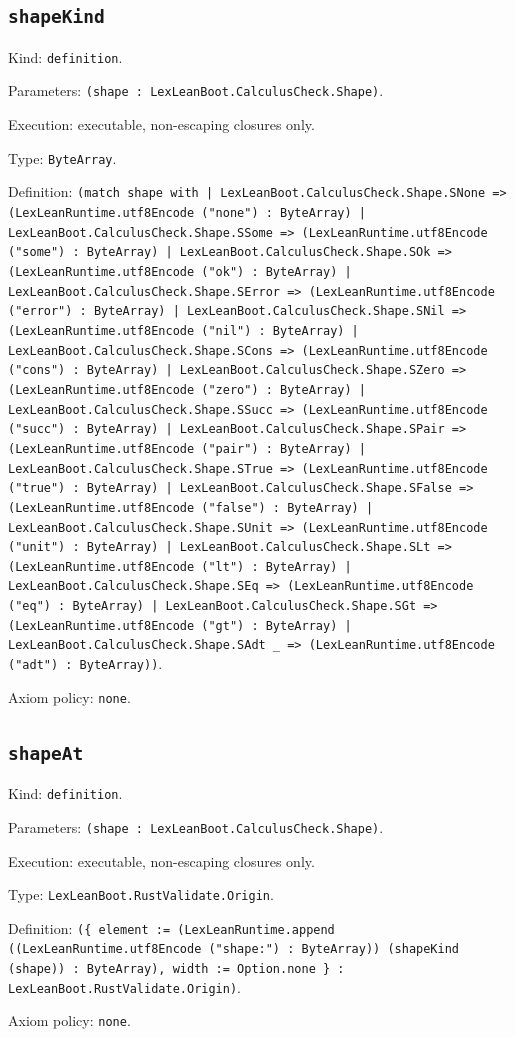 \documentclass[11pt]{article}
\begin{document}
\subsection*{\texttt{shapeKind}}
\noindent Kind: \texttt{definition}.\par
\noindent Parameters: \texttt{(shape : LexLeanBoot.CalculusCheck.Shape)}.\par
\noindent Execution: executable, non-escaping closures only.\par
\noindent Type: \texttt{ByteArray}.\par
\noindent Definition: \texttt{(match shape with | LexLeanBoot.CalculusCheck.Shape.SNone => (LexLeanRuntime.utf8Encode ("none") : ByteArray) | LexLeanBoot.CalculusCheck.Shape.SSome => (LexLeanRuntime.utf8Encode ("some") : ByteArray) | LexLeanBoot.CalculusCheck.Shape.SOk => (LexLeanRuntime.utf8Encode ("ok") : ByteArray) | LexLeanBoot.CalculusCheck.Shape.SError => (LexLeanRuntime.utf8Encode ("error") : ByteArray) | LexLeanBoot.CalculusCheck.Shape.SNil => (LexLeanRuntime.utf8Encode ("nil") : ByteArray) | LexLeanBoot.CalculusCheck.Shape.SCons => (LexLeanRuntime.utf8Encode ("cons") : ByteArray) | LexLeanBoot.CalculusCheck.Shape.SZero => (LexLeanRuntime.utf8Encode ("zero") : ByteArray) | LexLeanBoot.CalculusCheck.Shape.SSucc => (LexLeanRuntime.utf8Encode ("succ") : ByteArray) | LexLeanBoot.CalculusCheck.Shape.SPair => (LexLeanRuntime.utf8Encode ("pair") : ByteArray) | LexLeanBoot.CalculusCheck.Shape.STrue => (LexLeanRuntime.utf8Encode ("true") : ByteArray) | LexLeanBoot.CalculusCheck.Shape.SFalse => (LexLeanRuntime.utf8Encode ("false") : ByteArray) | LexLeanBoot.CalculusCheck.Shape.SUnit => (LexLeanRuntime.utf8Encode ("unit") : ByteArray) | LexLeanBoot.CalculusCheck.Shape.SLt => (LexLeanRuntime.utf8Encode ("lt") : ByteArray) | LexLeanBoot.CalculusCheck.Shape.SEq => (LexLeanRuntime.utf8Encode ("eq") : ByteArray) | LexLeanBoot.CalculusCheck.Shape.SGt => (LexLeanRuntime.utf8Encode ("gt") : ByteArray) | LexLeanBoot.CalculusCheck.Shape.SAdt \_ => (LexLeanRuntime.utf8Encode ("adt") : ByteArray))}.\par
\noindent Axiom policy: \texttt{none}.\par
\subsection*{\texttt{shapeAt}}
\noindent Kind: \texttt{definition}.\par
\noindent Parameters: \texttt{(shape : LexLeanBoot.CalculusCheck.Shape)}.\par
\noindent Execution: executable, non-escaping closures only.\par
\noindent Type: \texttt{LexLeanBoot.RustValidate.Origin}.\par
\noindent Definition: \texttt{(\{ element := (LexLeanRuntime.append ((LexLeanRuntime.utf8Encode ("shape:") : ByteArray)) (shapeKind (shape)) : ByteArray), width := Option.none \} : LexLeanBoot.RustValidate.Origin)}.\par
\noindent Axiom policy: \texttt{none}.\par
\end{document}

